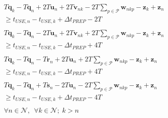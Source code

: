 \begin{equation}
    \begin{split}
        \begin{aligned}
            T \boldsymbol{q}_{k} - T \boldsymbol{q}_{n} + 2T \boldsymbol{u}_{n} 
            + 2T \boldsymbol{v}_{nk} - 2T \sum_{p \in \mathcal{P}}
            \boldsymbol{w}_{nkp} - \boldsymbol{z}_{k} + \boldsymbol{z}_{n}\\
            \ge t_{\mathit{USE},n} - t_{\mathit{USE},k}
            + \Delta t_{\mathit{PREP}} - 2T
        \end{aligned}\\
        \begin{aligned}
            T \boldsymbol{q}_{k} - T \boldsymbol{q}_{n} - 2T \boldsymbol{u}_{n} 
            + 2T \boldsymbol{v}_{nk} + 2T \sum_{p \in \mathcal{P}}
            \boldsymbol{w}_{nkp} - \boldsymbol{z}_{k} + \boldsymbol{z}_{n}\\
            \ge t_{\mathit{USE},n} - t_{\mathit{USE},k}
            - \Delta t_{\mathit{PREP}} + 4T
        \end{aligned}\\
        \begin{aligned}
            T \boldsymbol{q}_{k} - T \boldsymbol{q}_{n} - T \boldsymbol{r}_{n}
            + 2T \boldsymbol{u}_{n} + 2T \sum_{p \in \mathcal{P}}
            \boldsymbol{w}_{nkp} - \boldsymbol{z}_{k} + \boldsymbol{z}_{n}\\
            \ge t_{\mathit{USE},n} - t_{\mathit{USE},k}
            - \Delta t_{\mathit{PREP}} + 4T
        \end{aligned}\\
        \begin{aligned}
            T \boldsymbol{q}_{k} - T \boldsymbol{q}_{n} + T \boldsymbol{s}_{n}
            - 2T \boldsymbol{u}_{n} - 2T \sum_{p \in \mathcal{P}}
            \boldsymbol{w}_{nkp} - \boldsymbol{z}_{k} + \boldsymbol{z}_{n}\\
            \ge t_{\mathit{USE},n} - t_{\mathit{USE},k}
            + \Delta t_{\mathit{PREP}} - 4T
        \end{aligned}\\
        \begin{aligned}
            \forall n \in \mathcal{N}, \enspace \forall k \in \mathcal{N}; \;
            k > n
        \end{aligned}\\
    \end{split}
    \label{eq.k6}
\end{equation}

